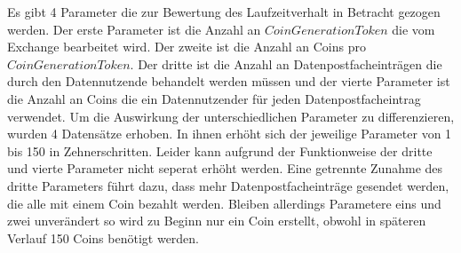 \documentclass{scrreprt}
\begin{document}
Es gibt 4 Parameter die zur Bewertung des Laufzeitverhalt in Betracht gezogen werden. Der erste Parameter ist die Anzahl an $CoinGenerationToken$ die vom Exchange bearbeitet wird. Der zweite ist die Anzahl an Coins pro $CoinGenerationToken$. Der dritte ist die Anzahl an Datenpostfacheinträgen die durch den Datennutzende behandelt werden müssen und der vierte Parameter ist die Anzahl an Coins die ein Datennutzender für jeden Datenpostfacheintrag verwendet. Um die Auswirkung der unterschiedlichen Parameter zu differenzieren, wurden 4 Datensätze erhoben. In ihnen erhöht sich der jeweilige Parameter von 1 bis 150 in Zehnerschritten. Leider kann aufgrund der Funktionweise der dritte und vierte Parameter nicht seperat erhöht werden. Eine getrennte Zunahme des dritte Parameters führt dazu, dass mehr Datenpostfacheinträge gesendet werden, die alle mit einem Coin bezahlt werden. Bleiben allerdings Parametere eins und zwei unverändert so wird zu Beginn nur ein Coin erstellt, obwohl in späteren Verlauf 150 Coins benötigt werden.\\
\end{document}
